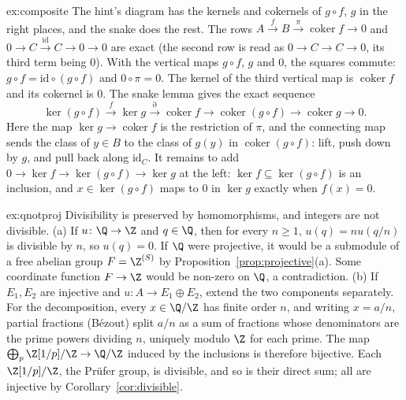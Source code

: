 \begin{solution}{ex:composite}
\idea The hint's diagram has the kernels and cokernels of $g\circ f$, $g$ in the right places, and the snake does the rest.
\writeup The rows $A\xrightarrow fB\xrightarrow\pi\operatorname{coker}f\to0$ and $0\to C\xrightarrow{\mathrm{id}}C\to0\to0$ are exact (the second row is read as $0\to C\to C\to0$, its third term being $0$). With the vertical maps $g\circ f$, $g$ and $0$, the squares
commute: $g\circ f=\mathrm{id}\circ(g\circ f)$ and $0\circ\pi=0$. The kernel of the third vertical map is $\operatorname{coker}f$ and its cokernel is $0$. The snake lemma gives the exact sequence
\[\ker(g\circ f)\xrightarrow f\ker g\xrightarrow\partial\operatorname{coker}f\to\operatorname{coker}(g\circ f)\to\operatorname{coker}g\to0.\]
Here the map $\ker g\to\operatorname{coker}f$ is the restriction of $\pi$, and the connecting map sends the class of $y\in B$ to the class of $g(y)$ in $\operatorname{coker}(g\circ f)$: lift, push down by $g$, and pull back along $\mathrm{id}_C$. It remains to add $0\to\ker f\to\ker(g\circ f)\to\ker g$ at the left: $\ker f\subseteq\ker(g\circ f)$
is an inclusion, and $x\in\ker(g\circ f)$ maps to $0$ in $\ker g$ exactly when $f(x)=0$.
\end{solution}

\begin{solution}{ex:qnotproj}
\idea Divisibility is preserved by homomorphisms, and integers are not divisible.
\writeup (a) If $u\colon\Q\to\Z$ and $q\in\Q$, then for every $n\ge1$, $u(q)=nu(q/n)$ is divisible by $n$, so $u(q)=0$. If $\Q$ were projective, it would be a submodule of a free abelian group $F=\Z^{(S)}$ by Proposition~\ref{prop:projective}(a).
Some coordinate function $F\to\Z$ would be non-zero on $\Q$, a contradiction.
(b) If $E_1,E_2$ are injective and $u\colon A\to E_1\oplus E_2$, extend the two components separately. For the decomposition, every $x\in\Q/\Z$ has finite order $n$, and writing $x=a/n$, partial fractions (Bézout) split $a/n$ as a sum of fractions
whose denominators are the prime powers dividing $n$, uniquely modulo $\Z$ for each prime. The map $\bigoplus_p\Z[1/p]/\Z\to\Q/\Z$ induced by the inclusions is therefore bijective. Each $\Z[1/p]/\Z$, the Prüfer group, is divisible, and so is their direct sum; all are injective
by Corollary~\ref{cor:divisible}.
\end{solution}

